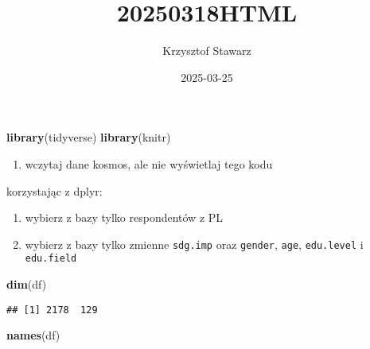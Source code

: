 \documentclass[
]{article}
\title{20250318HTML}
\author{Krzysztof Stawarz}
\date{2025-03-25}
\newenvironment{Shaded}{\begin{snugshade}}{\end{snugshade}}
\newcommand{\FunctionTok}[1]{\textcolor[rgb]{0.13,0.29,0.53}{\textbf{#1}}}
\newcommand{\NormalTok}[1]{#1}
\providecommand{\tightlist}{%
  \setlength{\itemsep}{0pt}\setlength{\parskip}{0pt}}
\begin{document}
\maketitle

\begin{Shaded}
\begin{Highlighting}[]
\FunctionTok{library}\NormalTok{(tidyverse)}
\FunctionTok{library}\NormalTok{(knitr)}
\end{Highlighting}
\end{Shaded}

\begin{enumerate}
\def\labelenumi{\alph{enumi})}
\tightlist
\item
  wczytaj dane kosmos, ale nie wyświetlaj tego kodu
\end{enumerate}

korzystając z dplyr:

\begin{enumerate}
\def\labelenumi{\alph{enumi})}
\setcounter{enumi}{1}
\tightlist
\item
  wybierz z bazy tylko respondentów z PL\\
\item
  wybierz z bazy tylko zmienne \texttt{sdg.imp} oraz \texttt{gender},
  \texttt{age}, \texttt{edu.level} i \texttt{edu.field}
\end{enumerate}

\begin{Shaded}
\begin{Highlighting}[]
\FunctionTok{dim}\NormalTok{(df)}
\end{Highlighting}
\end{Shaded}

\begin{verbatim}
## [1] 2178  129
\end{verbatim}

\begin{Shaded}
\begin{Highlighting}[]
\FunctionTok{names}\NormalTok{(df)}
\end{Highlighting}
\end{Shaded}
\end{document}
